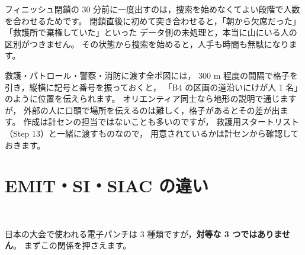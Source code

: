 \begin{Note}
フィニッシュ閉鎖の 30 分前に一度出すのは，捜索を始めなくてよい段階で人数を合わせるためです。
閉鎖直後に初めて突き合わせると，「朝から欠席だった」「救護所で棄権していた」といった
データ側の未処理と，本当に山にいる人の区別がつきません。
その状態から捜索を始めると，人手も時間も無駄になります。
\end{Note}

\begin{Note}[救護に渡す地図に格子を入れておく]
救護・パトロール・警察・消防に渡す全ポ図には，
300 m 程度の間隔で格子を引き，縦横に記号と番号を振っておくと，
「B4 の区画の道沿いにけが人 1 名」のように位置を伝えられます。
オリエンティア同士なら地形の説明で通じますが，
外部の人に口頭で場所を伝えるのは難しく，格子があるとその差が出ます。
作成は計センの担当ではないことも多いのですが，
救護用スタートリスト（Step 13）と一緒に渡すものなので，
用意されているかは計センから確認しておきます。
\end{Note}

\section{EMIT・SI・SIAC の違い}
\tALL\ \tSI\ \tEMIT\ \tSIAC

日本の大会で使われる電子パンチは 3 種類ですが，\textbf{対等な 3 つではありません}。
まずこの関係を押さえます。


